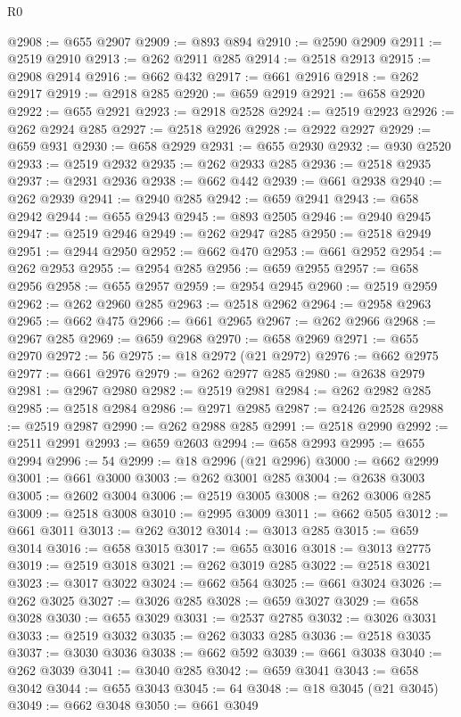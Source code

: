 \begin{lexlean}{R0}
\begin{coremodule}
@2908 := @655 @2907
@2909 := @893 @894
@2910 := @2590 @2909
@2911 := @2519 @2910
@2913 := @262 @2911 @285
@2914 := @2518 @2913
@2915 := @2908 @2914
@2916 := @662 @432
@2917 := @661 @2916
@2918 := @262 @2917
@2919 := @2918 @285
@2920 := @659 @2919
@2921 := @658 @2920
@2922 := @655 @2921
@2923 := @2918 @2528
@2924 := @2519 @2923
@2926 := @262 @2924 @285
@2927 := @2518 @2926
@2928 := @2922 @2927
@2929 := @659 @931
@2930 := @658 @2929
@2931 := @655 @2930
@2932 := @930 @2520
@2933 := @2519 @2932
@2935 := @262 @2933 @285
@2936 := @2518 @2935
@2937 := @2931 @2936
@2938 := @662 @442
@2939 := @661 @2938
@2940 := @262 @2939
@2941 := @2940 @285
@2942 := @659 @2941
@2943 := @658 @2942
@2944 := @655 @2943
@2945 := @893 @2505
@2946 := @2940 @2945
@2947 := @2519 @2946
@2949 := @262 @2947 @285
@2950 := @2518 @2949
@2951 := @2944 @2950
@2952 := @662 @470
@2953 := @661 @2952
@2954 := @262 @2953
@2955 := @2954 @285
@2956 := @659 @2955
@2957 := @658 @2956
@2958 := @655 @2957
@2959 := @2954 @2945
@2960 := @2519 @2959
@2962 := @262 @2960 @285
@2963 := @2518 @2962
@2964 := @2958 @2963
@2965 := @662 @475
@2966 := @661 @2965
@2967 := @262 @2966
@2968 := @2967 @285
@2969 := @659 @2968
@2970 := @658 @2969
@2971 := @655 @2970
@2972 := 56
@2975 := @18 @2972 (@21 @2972)
@2976 := @662 @2975
@2977 := @661 @2976
@2979 := @262 @2977 @285
@2980 := @2638 @2979
@2981 := @2967 @2980
@2982 := @2519 @2981
@2984 := @262 @2982 @285
@2985 := @2518 @2984
@2986 := @2971 @2985
@2987 := @2426 @2528
@2988 := @2519 @2987
@2990 := @262 @2988 @285
@2991 := @2518 @2990
@2992 := @2511 @2991
@2993 := @659 @2603
@2994 := @658 @2993
@2995 := @655 @2994
@2996 := 54
@2999 := @18 @2996 (@21 @2996)
@3000 := @662 @2999
@3001 := @661 @3000
@3003 := @262 @3001 @285
@3004 := @2638 @3003
@3005 := @2602 @3004
@3006 := @2519 @3005
@3008 := @262 @3006 @285
@3009 := @2518 @3008
@3010 := @2995 @3009
@3011 := @662 @505
@3012 := @661 @3011
@3013 := @262 @3012
@3014 := @3013 @285
@3015 := @659 @3014
@3016 := @658 @3015
@3017 := @655 @3016
@3018 := @3013 @2775
@3019 := @2519 @3018
@3021 := @262 @3019 @285
@3022 := @2518 @3021
@3023 := @3017 @3022
@3024 := @662 @564
@3025 := @661 @3024
@3026 := @262 @3025
@3027 := @3026 @285
@3028 := @659 @3027
@3029 := @658 @3028
@3030 := @655 @3029
@3031 := @2537 @2785
@3032 := @3026 @3031
@3033 := @2519 @3032
@3035 := @262 @3033 @285
@3036 := @2518 @3035
@3037 := @3030 @3036
@3038 := @662 @592
@3039 := @661 @3038
@3040 := @262 @3039
@3041 := @3040 @285
@3042 := @659 @3041
@3043 := @658 @3042
@3044 := @655 @3043
@3045 := 64
@3048 := @18 @3045 (@21 @3045)
@3049 := @662 @3048
@3050 := @661 @3049

\end{coremodule}
\end{lexlean}
